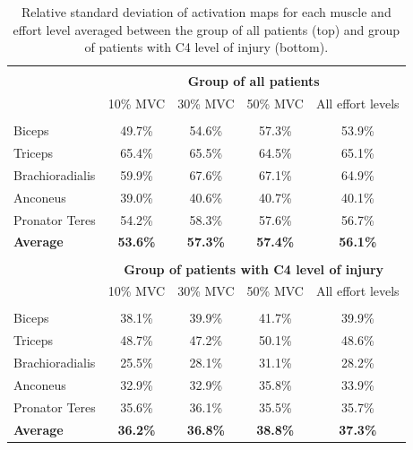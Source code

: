 \begin{table}[]
\centering
\caption{Relative standard deviation of activation maps for each muscle and effort level averaged between the group of all patients (top) and group of patients with C4 level of injury (bottom).}
\label{tb:2-1}
\begin{tabular}{lcccc}
 & & & &\\
                & \multicolumn{4}{c}{\large{\textbf{Group of all patients}}}                \\ 
                & 10\% MVC                                 & 30\% MVC & 50\% MVC & All effort levels \\ \hline
                &                                           &          &          &                   \\
Biceps          & 49.7\%                                    & 54.6\%   & 57.3\%   & 53.9\%            \\
Triceps         & 65.4\%                                    & 65.5\%   & 64.5\%   & 65.1\%            \\
Brachioradialis & 59.9\%                                    & 67.6\%   & 67.1\%   & 64.9\%            \\
Anconeus        & 39.0\%                                    & 40.6\%   & 40.7\%   & 40.1\%            \\
Pronator Teres  & 54.2\%                                    & 58.3\%   & 57.6\%   & 56.7\%            \\
\textbf{Average}    & \textbf{53.6\%}  & \textbf{57.3\%}  & \textbf{57.4\%} & \textbf{56.1\%}            \\
                &                                           &          &          &                   \\
                & \multicolumn{4}{c}{\large{\textbf{Group of patients with C4 level of injury}}}                    \\
                & 10\% MVC                                 & 30\% MVC & 50\% MVC & All effort levels \\ \hline
                &                                           &          &          &                   \\
Biceps          & 38.1\%                                    & 39.9\%   & 41.7\%   & 39.9\%            \\
Triceps         & 48.7\%                                    & 47.2\%   & 50.1\%   & 48.6\%            \\
Brachioradialis & 25.5\%                                    & 28.1\%   & 31.1\%   & 28.2\%            \\
Anconeus        & 32.9\%                                    & 32.9\%   & 35.8\%   & 33.9\%            \\
Pronator Teres  & 35.6\%                                    & 36.1\%   & 35.5\%   & 35.7\%            \\
\textbf{Average}     & \textbf{36.2\%}        & \textbf{36.8\%}  & \textbf{38.8\%} & \textbf{37.3\%}          
\end{tabular}
\end{table}

